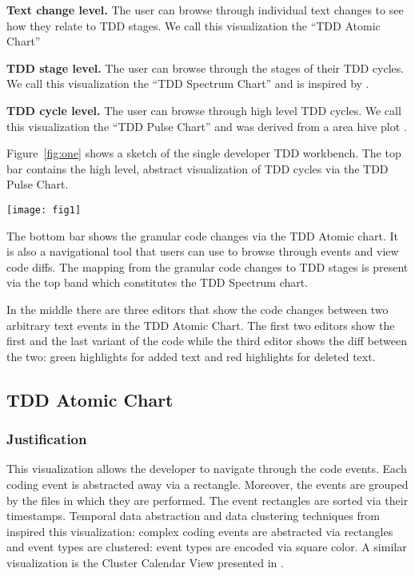 \documentclass[journal]{vgtc}                %
\begin{document}
\textbf{Text change level.} The user can browse through individual text changes to see how they relate to TDD stages. We call this visualization the ``TDD Atomic Chart''

\textbf{TDD stage level.} The user can browse through the stages of their TDD cycles. We call this visualization the ``TDD Spectrum Chart'' and is inspired by \cite{one}.

\textbf{TDD cycle level.} The user can browse through high level TDD cycles. We call this visualization the ``TDD Pulse Chart'' and was derived from a area hive plot \cite{four}. 

Figure~\ref{fig:one} shows a sketch of the single developer TDD workbench.
The top bar contains the high level, abstract visualization of TDD cycles via the TDD Pulse Chart. 

\begin{figure*}[hbt]
	\texttt{[image: fig1]}
	\caption{Overall view}
\label{fig:one}
\end{figure*}

The bottom bar shows the granular code changes via the TDD Atomic chart. It is also a navigational tool that users can use to browse through events and view code diffs.
The mapping from the granular code changes to TDD stages is present via the top band which constitutes the TDD Spectrum chart.

In the middle there are three editors that show the code changes between two arbitrary text events in the TDD Atomic Chart. The first two editors show the first and the last variant of the code while the third editor shows the diff between the two: green highlights for added text and red highlights for deleted text.

\subsection{TDD Atomic Chart}
\label{sec:atomic}

\subsubsection{Justification}

This visualization allows the developer to navigate through the code events.
Each coding event is abstracted away via a rectangle. Moreover, the events are grouped by the files in which they are performed. The event rectangles are sorted via their timestamps. Temporal data abstraction and data clustering techniques from \cite{one} inspired this visualization: complex coding events are abstracted via rectangles and event types are clustered: event types are encoded via square color. A similar visualization is the Cluster Calendar View presented in \cite{one}.
\end{document}
